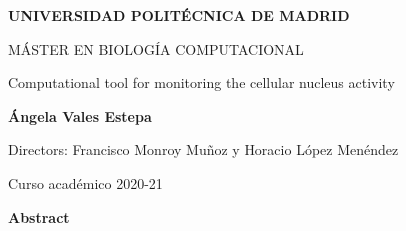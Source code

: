 \documentclass[12pt, a4paper]{article} %
\begin{document}
\setlength{\parindent}{8pt}

\pagestyle{empty}


\begin{titlepage}

{} %
\vspace{1cm}

\centering
{ \bfseries \Large UNIVERSIDAD POLITÉCNICA DE MADRID}
\vspace{2cm}

{ \Large MÁSTER EN BIOLOGÍA COMPUTACIONAL}
\vspace{2cm}

{\Large Computational tool for monitoring the cellular nucleus activity}\vspace{2cm}

{\bfseries \LARGE Ángela Vales Estepa}\vspace{2cm}

{\Large Directors: Francisco Monroy Muñoz y Horacio López Menéndez}\vspace{20mm} 

{\large Curso acad\'emico 2020-21}\vspace{5mm} 

\end{titlepage}
\newpage


{\bfseries \Large Abstract }\vspace{5mm} 

\vspace{1cm}

\newpage


\tableofcontents
\setcounter{tocdepth}{2}
\newpage

\setcounter{page}{1}
\pagestyle{fancy}
\lhead{ }
\renewcommand{\headrulewidth}{0.005pt}

\setlength{\parskip}{0mm}
\end{document}
